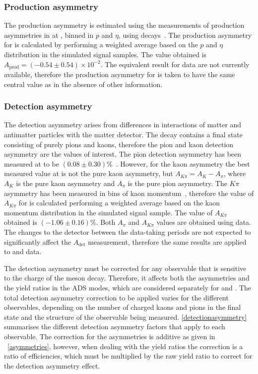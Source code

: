 \subsubsection{Production asymmetry}

The \Bpm production asymmetry is estimated using the measurements of production asymmetries in \runone at \lhcb, binned in $p$ and $\eta$, using \decay{\Bp}{\Dzb\pip} decays~\cite{LHCb-PAPER-2016-054}. The production asymmetry for \btodkst is calculated by performing a weighted average based on the $p$ and $\eta$ distribution in the simulated signal samples. The value obtained is $A_{\text{prod}} = (-0.54 \pm 0.54) \times 10^{-2}$. The equivalent result for \runtwo data are not currently available, therefore the production asymmetry for \runtwo is taken to have the same central value as \runone in the absence of other information. 

\subsubsection{Detection asymmetry}

The detection asymmetry arises from differences in interactions of matter and antimatter particles with the matter detector. The \btodkst decay contains a final state consisting of purely pions and kaons, therefore the pion and kaon detection asymmetry are the values of interest. The pion detection asymmetry has been measured at \lhcb to be $(0.08 \pm 0.30)\%$~\cite{pi_det_asym}. However, for the kaon asymmetry the best measured value at \lhcb is not the pure kaon asymmetry, but $A_{K\pi} = A_K - A_{\pi}$, where $A_K$ is the pure kaon asymmetry and $A_{\pi}$ is the pure pion asymmetry. The $K\pi$ asymmetry has been measured in bins of kaon momentum~\cite{k_det_asym}, therefore the value of $A_{K\pi}$ for \btodkst is calculated performing a weighted average based on the kaon momentum distribution in the simulated signal sample. The value of $A_{K\pi}$ obtained is $(-1.06 \pm 0.16)\%$. Both $A_{\pi}$ and $A_{K\pi}$ values are obtained using \runone data. The changes to the detector between the data-taking periods are not expected to significantly affect the $A_{\text{det}}$ measurement, therefore the same results are applied to \runone and \runtwo data. 

The detection asymmetry must be corrected for any \CP observable that is sensitive to the charge of the \B meson decay. Therefore, it affects both the asymmetries and the yield ratios in the ADS modes, which are considered separately for \Bm and \Bp. The total detection asymmetry correction to be applied varies for the different \CP observables, depending on the number of charged kaons and pions in the final state and the structure of the \CP observable being measured. \Tab\ref{detectionasymmetry} summarises the different detection asymmetry factors that apply to each observable. The correction for the asymmetries is additive as given in \eqn~\ref{asymmetries}, however, when dealing with the yield ratios the correction is a ratio of efficiencies, which must be multiplied by the raw yield ratio to correct for the detection asymmetry effect.

